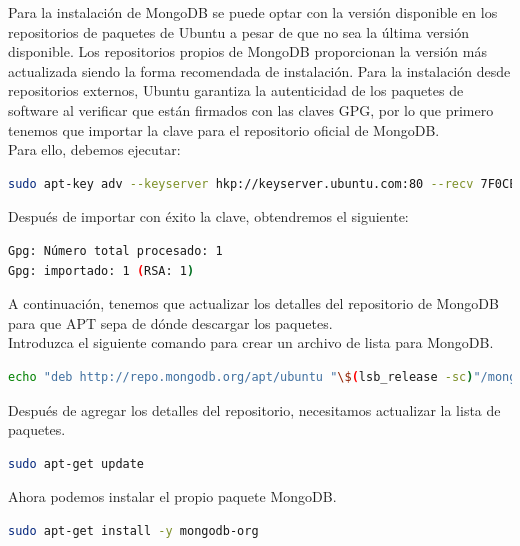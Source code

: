 \begin{appendix}
Para la instalación de MongoDB se puede optar con la versión disponible en los repositorios de paquetes de Ubuntu a pesar de que no sea la última versión disponible. Los repositorios propios de MongoDB proporcionan
la versión más actualizada siendo la forma recomendada de instalación. Para la instalación desde repositorios externos, Ubuntu garantiza la autenticidad de los paquetes de software al verificar que están firmados
con las claves GPG, por lo que primero tenemos que importar la clave para el repositorio oficial de MongoDB.\\

Para ello, debemos ejecutar:\\

\begin{lstlisting}[language=bash]
sudo apt-key adv --keyserver hkp://keyserver.ubuntu.com:80 --recv 7F0CEB10
\end{lstlisting}


Después de importar con éxito la clave, obtendremos el siguiente:\\

\begin{lstlisting}[language=bash]
Gpg: Número total procesado: 1
Gpg: importado: 1 (RSA: 1)
\end{lstlisting}

A continuación, tenemos que actualizar los detalles del repositorio de MongoDB para que APT sepa de dónde descargar los paquetes.\\

Introduzca el siguiente comando para crear un archivo de lista para MongoDB.\\

\begin{lstlisting}[language=bash]
echo "deb http://repo.mongodb.org/apt/ubuntu "\$(lsb_release -sc)"/mongodb-org/3.0 multiverse" | sudo tee /etc/apt/sources.list.d/mongodb-org-3.0.list
\end{lstlisting}

Después de agregar los detalles del repositorio, necesitamos actualizar la lista de paquetes.\\

\begin{lstlisting}[language=bash]
sudo apt-get update
\end{lstlisting}


Ahora podemos instalar el propio paquete MongoDB.\\

\begin{lstlisting}[language=bash]
sudo apt-get install -y mongodb-org
\end{lstlisting}


\end{appendix}
